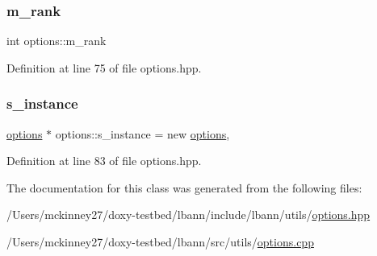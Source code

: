 \subsubsection{\texorpdfstring{m\+\_\+rank}{m\_rank}}
{\footnotesize\ttfamily int options\+::m\+\_\+rank\hspace{0.3cm}{\ttfamily [private]}}



Definition at line 75 of file options.\+hpp.

\mbox{\label{classoptions_ab10ed8295e9333b025619195d156a9ed}} 
\subsubsection{\texorpdfstring{s\+\_\+instance}{s\_instance}}
{\footnotesize\ttfamily \hyperlink{classoptions}{options} $\ast$ options\+::s\+\_\+instance = new \hyperlink{classoptions}{options}\hspace{0.3cm}{\ttfamily [static]}, {\ttfamily [private]}}



Definition at line 83 of file options.\+hpp.



The documentation for this class was generated from the following files\+:\begin{DoxyCompactItemize}
\item 
/\+Users/mckinney27/doxy-\/testbed/lbann/include/lbann/utils/\hyperlink{options_8hpp}{options.\+hpp}\item 
/\+Users/mckinney27/doxy-\/testbed/lbann/src/utils/\hyperlink{options_8cpp}{options.\+cpp}\end{DoxyCompactItemize}
